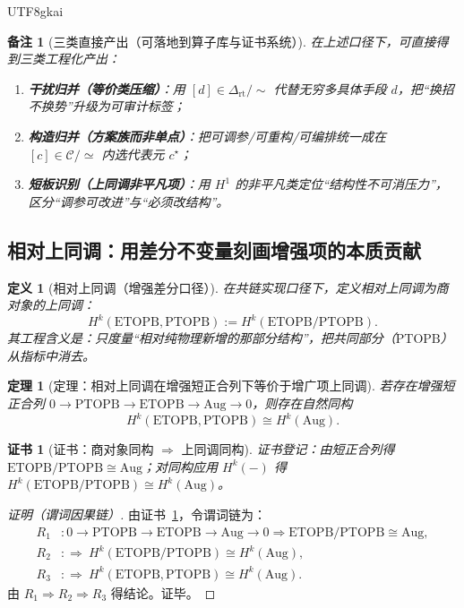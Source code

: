 \documentclass[12pt]{article}
\newtheorem{definition}{定义}[section]
\newtheorem{theorem}{定理}[section]
\newtheorem{remark}{备注}[section]
\newtheorem{Certificate}{证书}[section]
\newcommand{\PTOPB}{\ensuremath{\mathrm{PTOPB}}}
\newcommand{\ETOPB}{\ensuremath{\mathrm{ETOPB}}}
\newcommand{\Aug}{\ensuremath{\mathrm{Aug}}}
\newcommand{\DeltaRT}{\ensuremath{\Delta_{\mathrm{rt}}}}
\begin{document}
\begin{CJK*}{UTF8}{gkai}
\begin{remark}[三类直接产出（可落地到算子库与证书系统）]
在上述口径下，可直接得到三类工程化产出：
\begin{enumerate}
  \item \textbf{干扰归并（等价类压缩）}：用 $[d]\in\DeltaRT/\!\sim$ 代替无穷多具体手段 $d$，把“换招不换势”升级为可审计标签；
  \item \textbf{构造归并（方案族而非单点）}：把可调参/可重构/可编排统一成在 $[c]\in\mathcal{C}/\!\simeq$ 内选代表元 $c^\star$；
  \item \textbf{短板识别（上同调非平凡项）}：用 $H^1$ 的非平凡类定位“结构性不可消压力”，区分“调参可改进”与“必须改结构”。
\end{enumerate}
\end{remark}

\subsection{相对上同调：用差分不变量刻画增强项的本质贡献}
\label{sec:relative-cohomology-augmentation}

\begin{definition}[相对上同调（增强差分口径）]
在共链实现口径下，定义相对上同调为商对象的上同调：
\[
  H^k(\ETOPB,\PTOPB) := H^k(\ETOPB/\PTOPB).
\]
其工程含义是：只度量“相对纯物理新增的那部分结构”，把共同部分（\PTOPB{}）从指标中消去。
\end{definition}

\begin{theorem}[定理：相对上同调在增强短正合列下等价于增广项上同调]
\label{thm:relative-cohomology-is-aug}
若存在增强短正合列 $0\to\PTOPB\to\ETOPB\to\Aug\to 0$，则存在自然同构
\[
  H^k(\ETOPB,\PTOPB) \cong H^k(\Aug).
\]
\end{theorem}

\begin{Certificate}[证书：商对象同构 $\Rightarrow$ 上同调同构]
\label{cert:relative-cohomology-is-aug}
证书登记：由短正合列得 $\ETOPB/\PTOPB \cong \Aug$；对同构应用 $H^k(-)$ 得 $H^k(\ETOPB/\PTOPB)\cong H^k(\Aug)$。
\end{Certificate}

\begin{proof}[证明（谓词因果链）]
由证书~\ref{cert:relative-cohomology-is-aug}，令谓词链为：
\[
\begin{aligned}
  R_1 &: 0\to\PTOPB\to\ETOPB\to\Aug\to 0\Rightarrow \ETOPB/\PTOPB \cong \Aug,\\
  R_2 &: \Rightarrow\ H^k(\ETOPB/\PTOPB)\cong H^k(\Aug),\\
  R_3 &: \Rightarrow\ H^k(\ETOPB,\PTOPB)\cong H^k(\Aug).
\end{aligned}
\]
由 $R_1\Rightarrow R_2\Rightarrow R_3$ 得结论。证毕。
\end{proof}


\end{CJK*}
\end{document}
